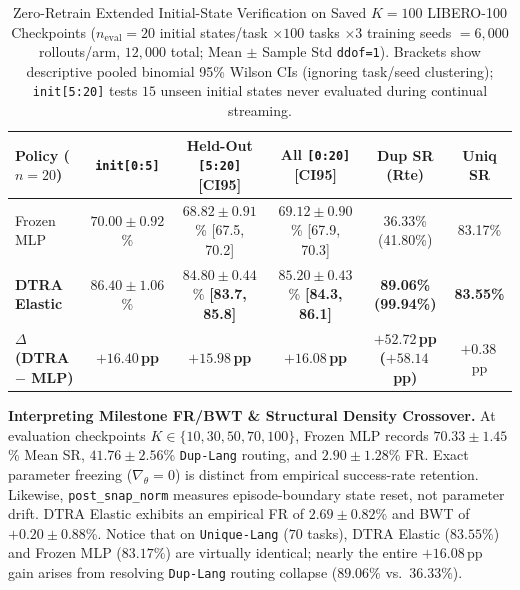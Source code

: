 \documentclass[10pt]{article}
\begin{document}
\begin{table}[ht!]
  \centering
  \caption{Zero-Retrain Extended Initial-State Verification on Saved $K=100$ LIBERO-100 Checkpoints ($n_{\text{eval}}=20$ initial states/task $\times 100$ tasks $\times 3$ training seeds $= 6{,}000$ rollouts/arm, $12{,}000$ total; Mean $\pm$ Sample Std \texttt{ddof=1}). Brackets show descriptive pooled binomial 95\% Wilson CIs (ignoring task/seed clustering); \texttt{init[5:20]} tests $15$ unseen initial states never evaluated during continual streaming.}
  \label{tab:libero100_neval20}
  \fontsize{7.8pt}{9.6pt}\selectfont
  \setlength{\tabcolsep}{2.6pt}
  \begin{tabular}{lccccc}
    \toprule
    \textbf{Policy ($n=20$)} & \textbf{\texttt{init[0:5]}} & \textbf{Held-Out \texttt{[5:20]} [CI95]} & \textbf{All \texttt{[0:20]} [CI95]} & \textbf{Dup SR (Rte)} & \textbf{Uniq SR} \\
    \midrule
    Frozen MLP & $70.00 \pm 0.92$\% & $68.82 \pm 0.91$\% [67.5, 70.2] & $69.12 \pm 0.90$\% [67.9, 70.3] & 36.33\% (41.80\%) & 83.17\% \\
    \textbf{DTRA Elastic} & $\mathbf{86.40 \pm 1.06}$\% & $\mathbf{84.80 \pm 0.44}$\% \textbf{[83.7, 85.8]} & $\mathbf{85.20 \pm 0.43}$\% \textbf{[84.3, 86.1]} & \textbf{89.06\% (99.94\%)} & \textbf{83.55\%} \\
    \midrule
    \textbf{$\Delta$ (DTRA $-$ MLP)} & \textbf{$+16.40$\,pp} & \textbf{$+15.98$\,pp} & \textbf{$+16.08$\,pp} & \textbf{$+52.72$\,pp ($+58.14$\,pp)} & $+0.38$\,pp \\
    \bottomrule
  \end{tabular}
\end{table}


\textbf{Interpreting Milestone FR/BWT \& Structural Density Crossover.}
At evaluation checkpoints $K \in \{10, 30, 50, 70, 100\}$, Frozen MLP records $70.33 \pm 1.45$\% Mean SR, $41.76 \pm 2.56$\% \texttt{Dup-Lang} routing, and $2.90 \pm 1.28$\% FR. Exact parameter freezing ($\nabla_\theta=0$) is distinct from empirical success-rate retention. Likewise, \texttt{post\_snap\_norm} measures episode-boundary state reset, not parameter drift. DTRA Elastic exhibits an empirical FR of $2.69 \pm 0.82$\% and BWT of $+0.20 \pm 0.88$\%. Notice that on \texttt{Unique-Lang} ($70$ tasks), DTRA Elastic ($83.55\%$) and Frozen MLP ($83.17\%$) are virtually identical; nearly the entire $+16.08\,$pp gain arises from resolving \texttt{Dup-Lang} routing collapse ($89.06\%$ vs.\ $36.33\%$).

\end{document}
